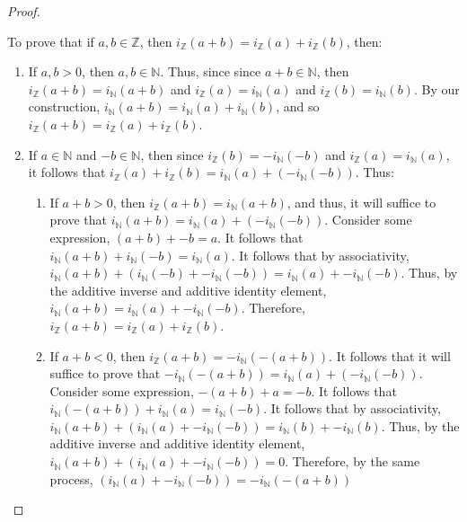 \documentclass[openany, amssymb, psamsfonts]{amsart}
\newcommand{\bbN}{\mathbb{N}}
\newcommand{\bbZ}{\mathbb{Z}}
\theoremstyle{definition}
\numberwithin{equation}{section}
\begin{document}
\begin{proof}
\begin{enumerate}
\end{enumerate}
To prove that if $a,b\in \bbZ$, then $i_\bbZ(a+b) = i_\bbZ(a) + i_\bbZ(b)$, then:
\begin{enumerate}
    \item If $a,b>0$, then $a,b \in \bbN$. Thus, since since $a+b \in \bbN$, then $i_\bbZ(a+b) = i_\bbN (a+b)$ and $i_\bbZ(a) = i_\bbN(a)$ and $i_\bbZ(b) = i_\bbN(b)$. By our construction, $i_\bbN(a+b) = i_\bbN(a) + i_\bbN(b)$, and so $i_\bbZ(a+b) = i_\bbZ(a) + i_\bbZ(b)$.
    \item If $a\in \bbN$ and $-b\in \bbN$, then since $i_\bbZ(b) = -i_\bbN(-b)$ and $i_\bbZ(a) = i_\bbN(a)$, it follows that $i_\bbZ(a) + i_\bbZ(b) = i_\bbN(a) + (-i_\bbN(-b))$. Thus:
    \begin{enumerate}
        \item If $a+b >0$, then $i_\bbZ(a+b) = i_\bbN(a+b)$, and thus, it will suffice to prove that $i_\bbN(a+b) = i_\bbN(a)+ (-i_\bbN(-b))$. Consider some expression, $(a+b) + -b = a$. It follows that $i_\bbN(a+b) + i_\bbN(-b) = i_\bbN(a)$. It follows that by associativity, $i_\bbN(a+b) + (i_\bbN(-b) + -i_\bbN(-b))= i_\bbN(a)+-i_\bbN(-b)$. Thus, by the additive inverse and additive identity element, $i_\bbN(a+b)= i_\bbN(a)+-i_\bbN(-b)$. Therefore, $i_\bbZ(a+b) = i_\bbZ(a) + i_\bbZ (b)$.
        \item If $a+b<0$, then $i_\bbZ(a+b) = -i_\bbN(-(a+b))$. It follows that it will suffice to prove that $-i_\bbN(-(a+b)) = i_\bbN(a) + (-i_\bbN(-b))$. Consider some expression, $-(a+b) + a = -b$. It follows that $i_\bbN(-(a+b)) + i_\bbN(a) = i_\bbN(-b)$. It follows that by associativity, $i_\bbN(a+b) + (i_\bbN(a) + -i_\bbN(-b))= i_\bbN(b)+-i_\bbN(b)$. Thus, by the additive inverse and additive identity element, $i_\bbN(a+b) + (i_\bbN(a) + -i_\bbN(-b))= 0$. Therefore, by the same process, $(i_\bbN(a) + -i_\bbN(-b))= -i_\bbN(-(a+b))$
        

\end{enumerate}
\end{enumerate}
\end{proof}
\end{document}
